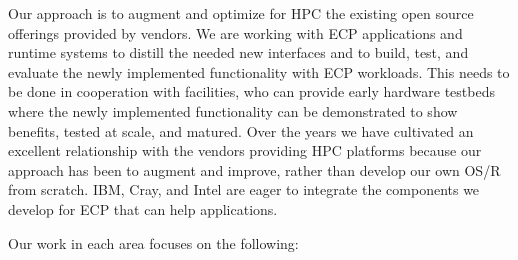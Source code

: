 Our approach is to augment and optimize for HPC the existing open source
offerings provided by vendors. We are working with ECP applications and
runtime systems to distill the needed new interfaces and to build, test,
and evaluate the newly implemented functionality with ECP workloads.  This
needs to be done in cooperation with facilities, who can provide early
hardware testbeds where the newly implemented functionality can be
demonstrated to show benefits, tested at scale, and matured.  Over the
years we have cultivated an excellent relationship with the vendors
providing HPC platforms because our approach has been to augment and
improve, rather than develop our own OS/R from scratch.  IBM, Cray, and
Intel are eager to integrate the components we develop for ECP that can
help applications.

Our work in each area focuses on the following:

